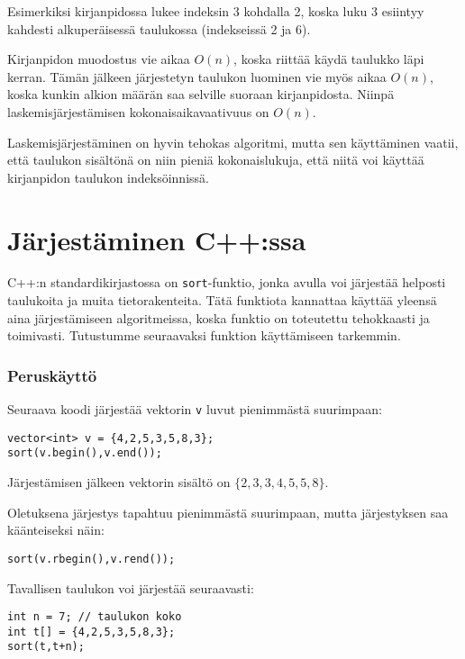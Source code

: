 Esimerkiksi kirjanpidossa lukee indeksin 3 kohdalla 2,
koska luku 3 esiintyy kahdesti alkuperäisessä
taulukossa (indekseissä 2 ja 6).

Kirjanpidon muodostus vie aikaa $O(n)$,
koska riittää käydä taulukko läpi kerran.
Tämän jälkeen järjestetyn taulukon luominen
vie myös aikaa $O(n)$, koska kunkin alkion
määrän saa selville suoraan kirjanpidosta.
Niinpä laskemisjärjestämisen
kokonaisaikavaativuus on $O(n)$.

Laskemisjärjestäminen on hyvin tehokas algoritmi,
mutta sen käyttäminen vaatii,
että taulukon sisältönä on niin pieniä
kokonaislukuja, että niitä voi käyttää
kirjanpidon taulukon indeksöinnissä.

\section{Järjestäminen C++:ssa}


C++:n standardikirjastossa on \texttt{sort}-funktio,
jonka avulla voi järjestää helposti taulukoita
ja muita tietorakenteita.
Tätä funktiota kannattaa käyttää yleensä aina
järjestämiseen algoritmeissa,
koska funktio on toteutettu tehokkaasti ja toimivasti.
Tutustumme seuraavaksi funktion käyttämiseen tarkemmin.

\subsubsection{Peruskäyttö}

Seuraava koodi järjestää vektorin \texttt{v}
luvut pienimmästä suurimpaan:

\begin{lstlisting}
vector<int> v = {4,2,5,3,5,8,3};
sort(v.begin(),v.end());
\end{lstlisting}

Järjestämisen jälkeen vektorin sisältö on
$\{2,3,3,4,5,5,8\}$.

Oletuksena järjestys tapahtuu pienimmästä suurimpaan,
mutta järjestyksen saa käänteiseksi näin:

\begin{lstlisting}
sort(v.rbegin(),v.rend());
\end{lstlisting}

Tavallisen taulukon voi järjestää seuraavasti:

\begin{lstlisting}
int n = 7; // taulukon koko
int t[] = {4,2,5,3,5,8,3};
sort(t,t+n);
\end{lstlisting}

